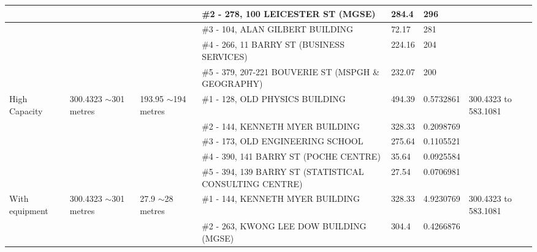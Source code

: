 \begin{table}[H]
{\begin{tabular}{|l|l|l|l|l|l|l|}
                        &                           &                          & \#2 - 278, 100 LEICESTER ST (MGSE)                      & 284.4         & 296             &                           \\ \hline
                        &                           &                          & \#3 - 104, ALAN GILBERT BUILDING                        & 72.17         & 281             &                           \\ \hline
                        &                           &                          & \#4 - 266, 11 BARRY ST (BUSINESS SERVICES)              & 224.16        & 204             &                           \\ \hline
                        &                           &                          & \#5 - 379, 207-221 BOUVERIE ST (MSPGH \& GEOGRAPHY)     & 232.07        & 200             &                           \\ \hline
High Capacity           & 300.4323 $\sim$301 metres & 193.95 $\sim$194 metres  & \#1 - 128, OLD PHYSICS BUILDING                         & 494.39        & 0.5732861       & 300.4323 to 583.1081      \\ \hline
                        &                           &                          & \#2 - 144, KENNETH MYER BUILDING                        & 328.33        & 0.2098769       &                           \\ \hline
                        &                           &                          & \#3 - 173, OLD ENGINEERING SCHOOL                       & 275.64        & 0.1105521       &                           \\ \hline
                        &                           &                          & \#4 - 390, 141 BARRY ST (POCHE CENTRE)                  & 35.64         & 0.0925584       &                           \\ \hline
                        &                           &                          & \#5 - 394, 139 BARRY ST (STATISTICAL CONSULTING CENTRE) & 27.54         & 0.0706981       &                           \\ \hline
With equipment         & 300.4323 $\sim$301 metres & 27.9 $\sim$28 metres     & \#1 - 144, KENNETH MYER BUILDING                        & 328.33        & 4.9230769       & 300.4323 to 583.1081      \\ \hline
                        &                           &                          & \#2 - 263, KWONG LEE DOW BUILDING (MGSE)                & 304.4         & 0.4266876       &                           \\ \hline

\end{tabular}}
\end{table}
